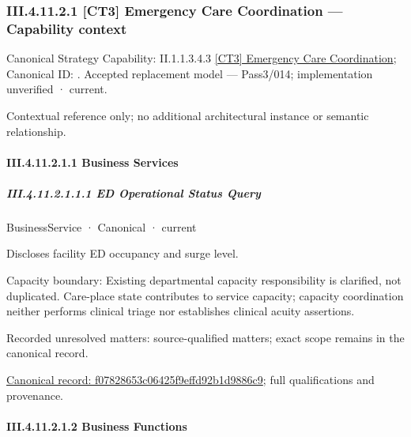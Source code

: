 \subsubsection*{III.4.11.2.1 [CT3] Emergency Care Coordination — Capability context}
\label{navigation:III.4.11.2.1}

{\small Canonical Strategy Capability: II.1.1.3.4.3 \hyperref[element:22cb7ae4bd6b4c73aa2d8f5210eee460]{[CT3] Emergency Care Coordination}; Canonical ID: \texttt{}. Accepted replacement model — Pass3/014; implementation unverified · current.}\par
Contextual reference only; no additional architectural instance or semantic relationship.\par
\paragraph*{III.4.11.2.1.1 Business Services}
\label{navigation:III.4.11.2.1.1}

\subparagraph*{III.4.11.2.1.1.1 ED Operational Status Query}
\label{navigation:III.4.11.2.1.1.1}

\label{element:f07828653c06425f9effd92b1d9886c9}
{\small BusinessService · Canonical · current}\par

Discloses facility ED occupancy and surge level.



Capacity boundary: Existing departmental capacity responsibility is clarified, not duplicated. Care-place state contributes to service capacity; capacity coordination neither performs clinical triage nor establishes clinical acuity assertions.


{\small Recorded unresolved matters: source-qualified matters; exact scope remains in the canonical record.}\par
{\footnotesize \href{../../../../../../../../continuum/business/business-service/f07828653c06425f9effd92b1d9886c9.md}{Canonical record: f07828653c06425f9effd92b1d9886c9}; full qualifications and provenance.}\par
\paragraph*{III.4.11.2.1.2 Business Functions}
\label{navigation:III.4.11.2.1.2}

